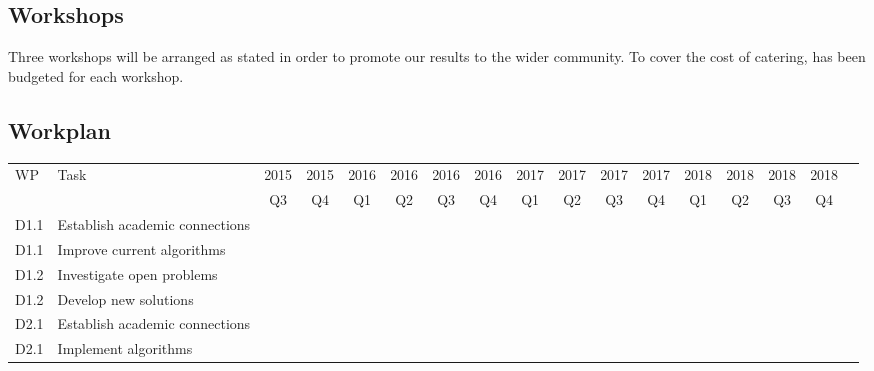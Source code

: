\documentclass[a4paper,11pt]{article}
\begin{document}
    \subsection{Workshops}

    Three workshops will be arranged as stated in order to promote our results to the wider community. To cover the cost of catering,  has been budgeted for each workshop.

    \newpage
    \begin{landscape}
    \section{Workplan}

    \begin{tabularx}{\linewidth}{|lX|c|c|c|c|c|c|c|c|c|c|c|c|c|c|c|}
        \hline
        \multirow{2}{*}{WP} & \multirow{2}{*}{Task} & 2015 & 2015 & 2016 & 2016 & 2016 & 2016 & 2017 & 2017 & 2017 & 2017 & 2018 & 2018 & 2018 & 2018 \\
        & & Q3 & Q4 & Q1 & Q2 & Q3 & Q4 & Q1 & Q2 & Q3 & Q4 & Q1 & Q2 & Q3 & Q4 \\\hline
        D1.1 & Establish academic connections & \cellcolor[gray]{0.5} & \cellcolor[gray]{0.5} & & & & & & & & & & & & \\\hline
        D1.1 & Improve current algorithms & \cellcolor[gray]{0.5} & \cellcolor[gray]{0.5} & \cellcolor[gray]{0.5} & \cellcolor[gray]{0.5} & \cellcolor[gray]{0.5} & \cellcolor[gray]{0.5} \cellcolor[gray]{0.5} & \cellcolor[gray]{0.5} & \cellcolor[gray]{0.5} & \cellcolor[gray]{0.5} & & & & & \\\hline
        D1.2 & Investigate open problems & & & & & & \cellcolor[gray]{0.5} & \cellcolor[gray]{0.5} & & & & & & & \\\hline
        D1.2 & Develop new solutions & & & & & & & \cellcolor[gray]{0.5} & \cellcolor[gray]{0.5} & \cellcolor[gray]{0.5} & \cellcolor[gray]{0.5} & \cellcolor[gray]{0.5} & \cellcolor[gray]{0.5} & \cellcolor[gray]{0.5} & \cellcolor[gray]{0.5} \\\hline
        D2.1 & Establish academic connections & \cellcolor[gray]{0.5} & \cellcolor[gray]{0.5} & & & & & & & & & & & & \\\hline
        D2.1 & Implement algorithms & \cellcolor[gray]{0.5} & \cellcolor[gray]{0.5} & \cellcolor[gray]{0.5} & \cellcolor[gray]{0.5} & \cellcolor[gray]{0.5} & \cellcolor[gray]{0.5} & \cellcolor[gray]{0.5} & \cellcolor[gray]{0.5} & & & & & & \\\hline

\end{tabularx}
\end{landscape}
\end{document}
